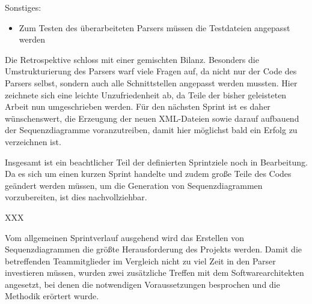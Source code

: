 Sonstiges:
\begin{itemize}
\item Zum Testen des überarbeiteten Parsers müssen die Testdateien angepasst werden
\end{itemize}
\nsecend%

Die Retrospektive schloss mit einer gemischten Bilanz. Besonders die Umstrukturierung des Parsers warf viele Fragen auf, da nicht nur der Code des Parsers selbst, sondern auch alle Schnittstellen angepasst werden mussten. Hier zeichnete sich eine leichte Unzufriedenheit ab, da Teile der bisher geleisteten Arbeit nun umgeschrieben werden. Für den nächsten Sprint ist es daher wünschenswert, die Erzeugung der neuen XML-Dateien sowie darauf aufbauend der Sequenzdiagramme voranzutreiben, damit hier möglichst bald ein Erfolg zu verzeichnen ist.
\nsecend%

Insgesamt ist ein beachtlicher Teil der definierten Sprintziele noch in Bearbeitung. Da es sich um einen kurzen Sprint handelte und zudem große Teile des Codes geändert werden müssen, um die Generation von Sequenzdiagrammen vorzubereiten, ist dies nachvollziehbar. 
\nsecend%

XXX
\nsecend%

Vom allgemeinen Sprintverlauf ausgehend wird das Erstellen von Sequenzdiagrammen die größte Herausforderung des Projekts werden. Damit die betreffenden Teammitglieder im Vergleich nicht zu viel Zeit in den Parser investieren müssen, wurden zwei zusätzliche Treffen mit dem Softwarearchitekten angesetzt, bei denen die notwendigen Voraussetzungen besprochen und die Methodik erörtert wurde.
\nsecend%
